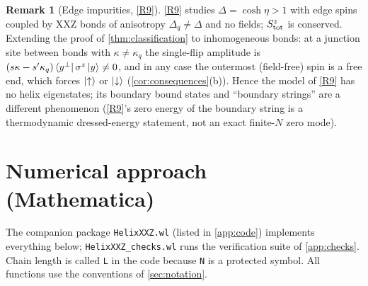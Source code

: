 \documentclass[11pt,a4paper]{article}
\theoremstyle{definition}
\newtheorem{remark}[theorem]{Remark}
\begin{document}
\begin{remark}[Edge impurities, \ref{R9}]\label{rem:R9}
\ref{R9} studies $\Delta=\cosh\eta>1$ with edge spins coupled by XXZ bonds of anisotropy $\Delta_q\neq\Delta$ and no fields; $S^z_{\rm tot}$ is conserved. Extending the proof of \cref{thm:classification} to inhomogeneous bonds: at a junction site between bonds with $\kappa\neq\kappa_q$ the single-flip amplitude is $(s\kappa-s'\kappa_q)\bra{y^\perp}\sigma^z\ket y\neq0$, and in any case the outermost (field-free) spin is a free end, which forces $\ket\uparrow$ or $\ket\downarrow$ (\cref{cor:consequences}(b)). Hence the model of \ref{R9} has no helix eigenstates; its boundary bound states and ``boundary strings'' are a different phenomenon (\ref{R9}'s zero energy of the boundary string is a thermodynamic dressed-energy statement, not an exact finite-$N$ zero mode).
\end{remark}

\section{Numerical approach (Mathematica)}\label{sec:numerics}

The companion package \texttt{HelixXXZ.wl} (listed in \cref{app:code}) implements everything below; \texttt{HelixXXZ\_checks.wl} runs the verification suite of \cref{app:checks}. Chain length is called \texttt{L} in the code because \texttt{N} is a protected symbol. All functions use the conventions of \cref{sec:notation}.
\end{document}
